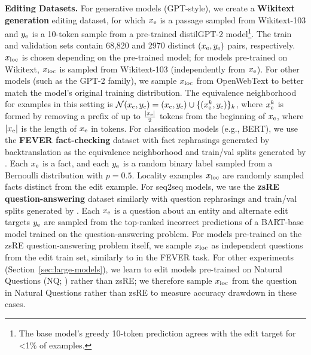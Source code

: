 \documentclass{article}
\begin{document}
\textbf{Editing Datasets.} For generative models (GPT-style), we create a \textbf{Wikitext generation} editing dataset, for which $x_\text{e}$ is a passage sampled from Wikitext-103 and $y_\text{e}$ is a 10-token sample from a pre-trained distilGPT-2 model\footnote{The base model's greedy 10-token prediction agrees with the edit target for \textless 1\% of examples.}. The train and validation sets contain 68,820 and 2970 distinct $(x_\text{e},y_\text{e})$ pairs, respectively. $x_\text{loc}$ is chosen depending on the pre-trained model; for models pre-trained on Wikitext, $x_\text{loc}$ is sampled from Wikitext-103 (independently from $x_\text{e}$). For other models (such as the GPT-2 family), we sample $x_\text{loc}$ from OpenWebText \citep{Gokaslan2019OpenWeb} to better match the model's original training distribution. The equivalence neighborhood for examples in this setting is $\mathcal{N}(x_\text{e},y_\text{e}) = (x_\text{e}, y_\text{e}) \cup \{(x_\text{e}^k,y_\text{e})\}_k$, where ${x_\text{e}^k}$ is formed by removing a prefix of up to $\frac{|x_\text{e}|}{2}$ tokens from the beginning of $x_\text{e}$, where $|x_\text{e}|$ is the length of $x_\text{e}$ in tokens. For classification models (e.g., BERT), we use the \textbf{FEVER fact-checking} dataset \citep{Thorne18Fever} with fact rephrasings generated by backtranslation as the equivalence neighborhood and train/val splits generated by \cite{Cao2021EditingFK}. Each $x_\text{e}$ is a fact, and each $y_\text{e}$ is a random binary label sampled from a Bernoulli distribution with $p=0.5$. Locality examples $x_\text{loc}$ are randomly sampled facts distinct from the edit example. For seq2seq models, we use the \textbf{zsRE question-answering} dataset \citep{levy2017zero} similarly with question rephrasings and train/val splits generated by \cite{Cao2021EditingFK}. Each $x_\text{e}$ is a question about an entity and alternate edit targets $y_\text{e}$ are sampled from the top-ranked incorrect predictions of a BART-base model trained on the question-answering problem. For models pre-trained on the zsRE question-answering problem itself, we sample $x_\text{loc}$ as independent questions from the edit train set, similarly to in the FEVER task. For other experiments (Section~\ref{sec:large-models}), we learn to edit models pre-trained on Natural Questions (NQ; \cite{kwiatkowski2019natural}) rather than zsRE; we therefore sample $x_\text{loc}$ from the question in Natural Questions rather than zsRE to measure accuracy drawdown in these cases.
\end{document}
